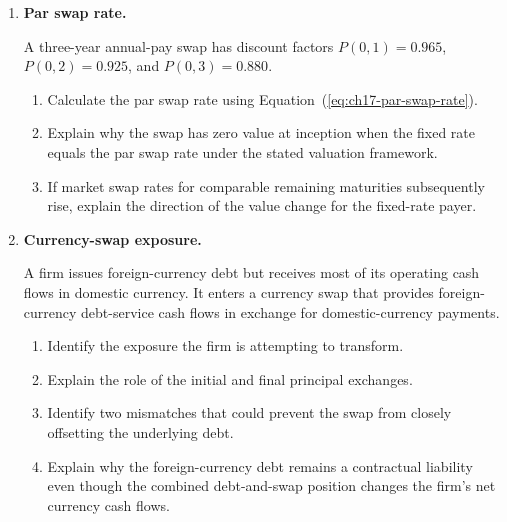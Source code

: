 \begin{enumerate}
\item \textbf{Par swap rate.}

A three-year annual-pay swap has discount factors
$P(0,1)=0.965$,$P(0,2)=0.925$, and $P(0,3)=0.880$.

\begin{enumerate}
\item Calculate the par swap rate using Equation~(\ref{eq:ch17-par-swap-rate}).
\item Explain why the swap has zero value at inception when the fixed rate equals the par swap rate under the stated valuation framework.
\item If market swap rates for comparable remaining maturities subsequently rise, explain the direction of the value change for the fixed-rate payer.
\end{enumerate}

\item \textbf{Currency-swap exposure.}

A firm issues foreign-currency debt but receives most of its operating cash flows in domestic currency. It enters a currency swap that provides foreign-currency debt-service cash flows in exchange for domestic-currency payments.

\begin{enumerate}

\item Identify the exposure the firm is attempting to transform.

\item Explain the role of the initial and final principal exchanges.

\item Identify two mismatches that could prevent the swap from closely offsetting the underlying debt.

\item Explain why the foreign-currency debt remains a contractual liability even though the combined debt-and-swap position changes the firm's net currency cash flows.

\end{enumerate}

\end{enumerate}



